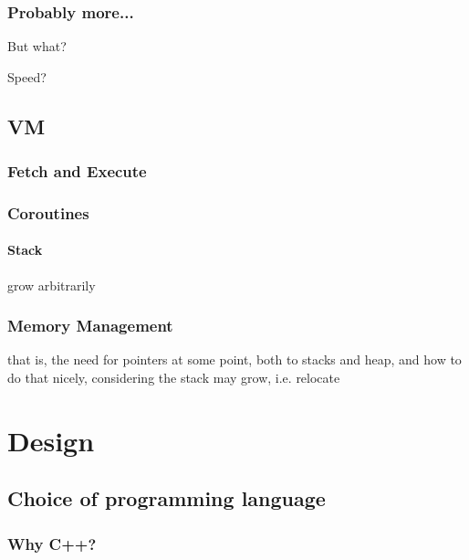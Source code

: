         \subsection{Probably more...}
            
            But what?
            
            Speed?
        
    \section{VM}
        
        \subsection{Fetch and Execute}
            
        \subsection{Coroutines}
            
            \subsubsection{Stack}
                
                grow arbitrarily
            
        \subsection{Memory Management}
            
            that is, the need for pointers at some point, both to stacks and heap, and how to do that nicely, considering the stack may grow, i.e. relocate
    

\chapter{Design} %
    \section{Choice of programming language}
        \subsection{Why C++?}
